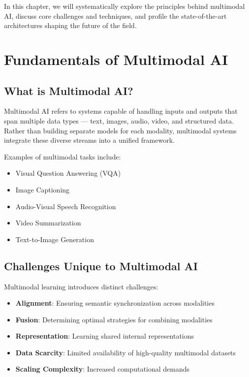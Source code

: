 \documentclass[openany]{book}
\begin{document}
In this chapter, we will systematically explore the principles behind multimodal 
AI, discuss core challenges and techniques, and profile the state-of-the-art 
architectures shaping the future of the field.

\section{Fundamentals of Multimodal AI}

\subsection{What is Multimodal AI?}
Multimodal AI refers to systems capable of handling inputs and outputs that span 
multiple data types — text, images, audio, video, and structured data. Rather 
than building separate models for each modality, multimodal systems integrate 
these diverse streams into a unified framework.

Examples of multimodal tasks include:
\begin{itemize}
    \item Visual Question Answering (VQA)
    \item Image Captioning
    \item Audio-Visual Speech Recognition
    \item Video Summarization
    \item Text-to-Image Generation
\end{itemize}

\subsection{Challenges Unique to Multimodal AI}
Multimodal learning introduces distinct challenges:
\begin{itemize}
    \item \textbf{Alignment}: Ensuring semantic synchronization across 
    modalities
    \item \textbf{Fusion}: Determining optimal strategies for combining 
    modalities
    \item \textbf{Representation}: Learning shared internal representations
    \item \textbf{Data Scarcity}: Limited availability of high-quality 
    multimodal datasets
    \item \textbf{Scaling Complexity}: Increased computational demands
\end{itemize}
\end{document}
